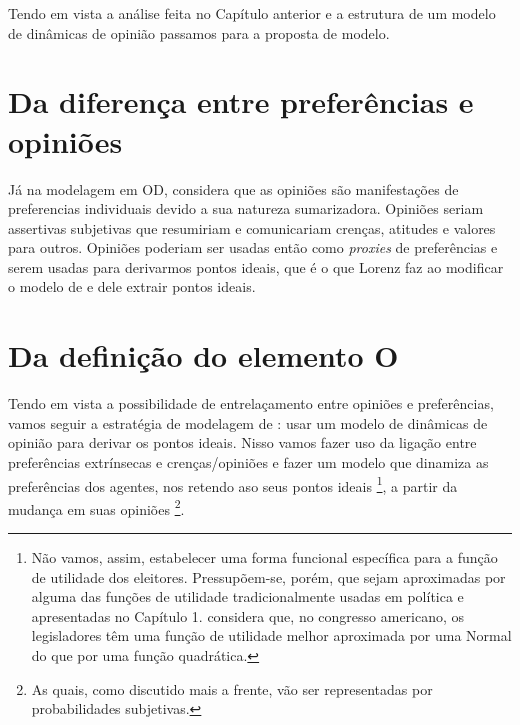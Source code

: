 Tendo em vista a análise feita no Capítulo anterior e a estrutura de um modelo de
dinâmicas de opinião passamos para a proposta de modelo.


\section{Da diferença entre preferências e opiniões}



Já na modelagem em OD,  considera que as opiniões
são manifestações de preferencias individuais devido a sua natureza
sumarizadora. Opiniões seriam assertivas subjetivas que resumiriam e
comunicariam crenças, atitudes e valores para outros. Opiniões poderiam ser
usadas então como \textit{proxies} de preferências e serem usadas para
derivarmos pontos ideais, que é o que Lorenz faz ao modificar o modelo de
 e dele extrair pontos ideais.



\section{Da definição do elemento O}

Tendo em vista a possibilidade de entrelaçamento entre opiniões e preferências,
vamos seguir a estratégia de modelagem de : usar
um modelo de dinâmicas de opinião para derivar os pontos ideais. Nisso vamos
fazer uso da ligação entre preferências extrínsecas e crenças/opiniões e fazer
um modelo que dinamiza as preferências dos agentes, nos retendo aso seus pontos ideais
\footnote{Não vamos, assim, estabelecer uma forma funcional específica para a
  função de utilidade dos eleitores. Pressupõem-se, porém, que sejam aproximadas
  por alguma das funções de utilidade tradicionalmente usadas em política e
  apresentadas no Capítulo 1.  considera que,
  no congresso americano, os legisladores têm uma função de utilidade melhor
  aproximada por uma Normal do que por uma função quadrática.}, a partir da
mudança em suas opiniões \footnote{As quais, como discutido mais a frente, vão
  ser representadas por probabilidades subjetivas.}.

